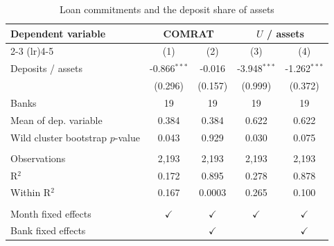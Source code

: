
\begin{table}[!h]
   \centering
   \small
   \begin{threeparttable}[b]
      \caption{\label{tab:krs_dep_assets} Loan commitments and the deposit share of assets}
      \bigskip
      \begin{tabular}{lcccc}
         \toprule
         Dependent variable & \multicolumn{2}{c}{COMRAT} & \multicolumn{2}{c}{$U$ / assets} \\ 
         \cmidrule(lr){2-3} \cmidrule(lr){4-5}
                                          & (1)            & (2)           & (3)            & (4)\\  
         \midrule 
         Deposits / assets                & -0.866$^{***}$ & -0.016        & -3.948$^{***}$ & -1.262$^{***}$\\   
                                          & (0.296)        & (0.157)       & (0.999)        & (0.372)\\   
         Banks                            & 19             & 19            & 19             & 19\\  
         Mean of dep. variable            & 0.384          & 0.384         & 0.622          & 0.622\\  
         Wild cluster bootstrap $p$-value & 0.043          & 0.929         & 0.030          & 0.075\\  
          \\
         Observations                     & 2,193          & 2,193         & 2,193          & 2,193\\  
         R$^2$                            & 0.172          & 0.895         & 0.278          & 0.878\\  
         Within R$^2$                     & 0.167          & 0.0003        & 0.265          & 0.100\\  
          \\
         Month fixed effects              & $\checkmark$   & $\checkmark$  & $\checkmark$   & $\checkmark$\\   
         Bank fixed effects               &                & $\checkmark$  &                & $\checkmark$\\   
         \bottomrule
      \end{tabular}
      

\end{threeparttable}
\end{table}
